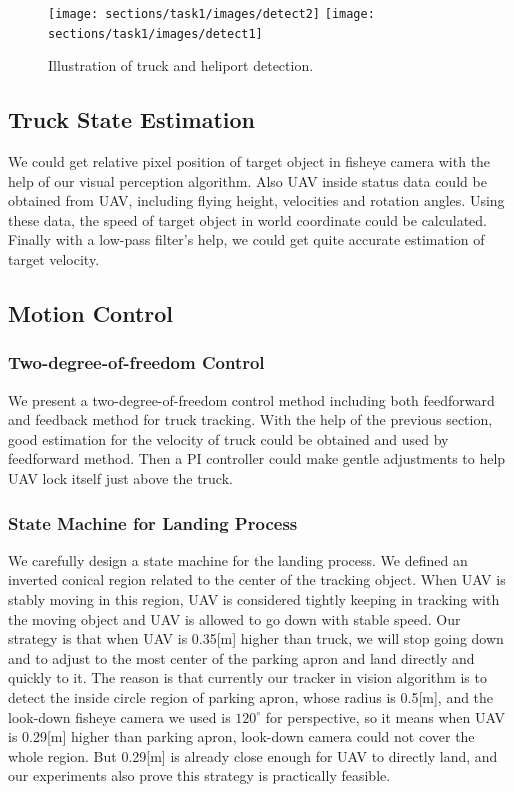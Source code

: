 \documentclass{standalone}
\begin{document}
\begin{figure}[t!]
  \centering
  \texttt{[image: sections/task1/images/detect2]}
  \texttt{[image: sections/task1/images/detect1]}
  \caption{Illustration of truck and heliport detection.}
\end{figure}

\subsection{Truck State Estimation}

We could get relative pixel position of target object in fisheye camera with the help of our visual perception algorithm. Also UAV inside status data could be obtained from UAV, including flying height, velocities and rotation angles. Using these data, the speed of target object in world coordinate could be calculated. Finally with a low-pass filter's help, we could get quite accurate estimation of target velocity.

\subsection{Motion Control}

\subsubsection{Two-degree-of-freedom Control}

We present a two-degree-of-freedom control method including both feedforward and feedback method for truck tracking. With the help of the previous section, good estimation for the velocity of truck could be obtained and used by feedforward method. Then a PI controller could make gentle adjustments to help UAV lock itself just above the truck.

\subsubsection{State Machine for Landing Process}

We carefully design a state machine for the landing process. We defined an inverted conical region related to the center of the tracking object. When UAV is stably moving in this region, UAV is considered tightly keeping in tracking with the moving object and UAV is allowed to go down with stable speed. Our strategy is that when UAV is 0.35[m] higher than truck, we will stop going down and to adjust to the most center of the parking apron and land directly and quickly to it. The reason is that currently our tracker in vision algorithm is to detect the inside circle region of parking apron, whose radius is 0.5[m], and the look-down fisheye camera we used is $120^\circ$  for perspective, so it means when UAV is 0.29[m] higher than parking apron, look-down camera could not cover the whole region. But 0.29[m] is already close enough for UAV to directly land, and our experiments also prove this strategy is practically feasible.
\end{document}
